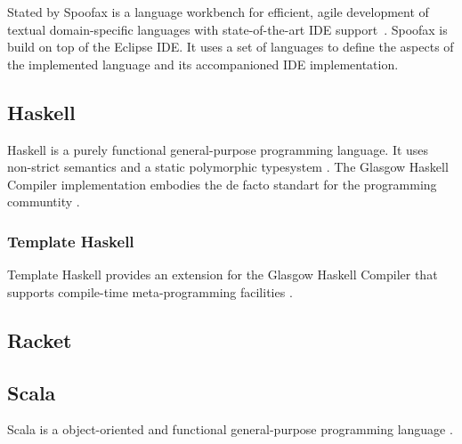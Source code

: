 Stated by \citeauthor{kats2010spoofax} Spoofax is a language workbench for efficient, agile development of textual domain-specific languages with state-of-the-art IDE support~\cite{kats2010spoofax}.
Spoofax is build on top of the Eclipse IDE.
It uses a set of languages to define the aspects of the implemented language and its accompanioned IDE implementation.

\subsection{Haskell}

Haskell is a purely functional general-purpose programming language.
It uses non-strict semantics and a static polymorphic typesystem \cite{peterson1996report}.
The Glasgow Haskell Compiler implementation embodies the de facto standart for the programming communtity \cite{jones1993glasgow}.

\subsubsection{Template Haskell}

Template Haskell provides an extension for the Glasgow Haskell Compiler that supports compile-time meta-programming facilities \cite{sheard2002template}.

\subsection{Racket}


\subsection{Scala}

Scala is a object-oriented and functional general-purpose programming language \cite{odersky2004overview}.


